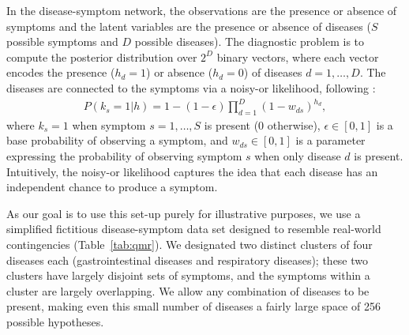 In the disease-symptom network, the observations are the presence or absence of symptoms and the latent variables are the presence or absence of diseases ($S$ possible symptoms and $D$ possible diseases). The diagnostic problem is to compute the posterior distribution over $2^D$ binary vectors, where each vector encodes the presence ($h_d=1$) or absence ($h_d=0$) of diseases $d = 1,\ldots,D$. The diseases are connected to the symptoms via a noisy-or likelihood, following \cite{shwe1991probabilistic}:
\begin{align}
P(k_s = 1|h) = 1 - (1-\epsilon) \prod_{d=1}^D (1-w_{ds})^{h_d},
\end{align}
where $k_s = 1$ when symptom $s = 1, \ldots, S$ is present (0 otherwise), $\epsilon \in [0,1]$ is a base probability of observing a symptom, and $w_{ds} \in [0,1]$ is a parameter expressing the probability of observing symptom $s$ when only disease $d$ is present. Intuitively, the noisy-or likelihood captures the idea that each disease has an independent chance to produce a symptom.

As our goal is to use this set-up purely for illustrative purposes, we use a simplified fictitious disease-symptom data set designed to resemble real-world contingencies (Table~\ref{tab:qmr}). We designated two distinct clusters of four diseases each (gastrointestinal diseases and respiratory diseases); these two clusters have largely disjoint sets of symptoms, and the symptoms within a cluster are largely overlapping. We allow any combination of diseases to be present, making even this small number of diseases a fairly large space of 256 possible hypotheses.


